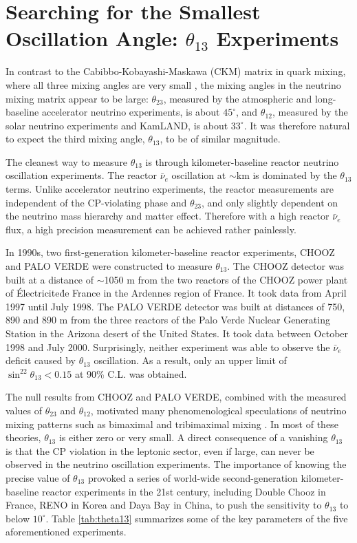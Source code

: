 \section{Searching for the Smallest Oscillation Angle: $\theta_{13}$ Experiments} 
\label{sec:theta13}
In contrast to the  Cabibbo-Kobayashi-Maskawa (CKM) matrix in quark mixing, where all three mixing angles are very small \cite{PDG14}, the mixing angles in the neutrino mixing matrix appear to be large: $\theta_{23}$, measured by the atmospheric \cite{Kajita} and long-baseline accelerator \cite{Feldman} neutrino experiments, is about $45^\circ$, and $\theta_{12}$, measured by the solar neutrino experiments and KamLAND, is about $33^\circ$. It was therefore natural to expect the third mixing angle, $\theta_{13}$, to be of similar magnitude.

The cleanest way to measure $\theta_{13}$ is through kilometer-baseline reactor neutrino oscillation experiments. The reactor $\bar\nu_e$ oscillation at $\sim$km is dominated by the $\theta_{13}$ terms. Unlike accelerator neutrino experiments, the reactor measurements are independent of the CP-violating phase and $\theta_{23}$, and only slightly dependent on the neutrino mass hierarchy and matter effect. Therefore with a high reactor $\bar\nu_e$ flux, a high precision measurement can be achieved rather painlessly. 

In 1990s, two first-generation kilometer-baseline reactor experiments, CHOOZ \cite{Chooz} and PALO VERDE \cite{Paloverde} were constructed to measure $\theta_{13}$. 
The CHOOZ detector was built at a distance of $\sim$1050 m from the two reactors of the CHOOZ power plant of \'{E}lectricite\'{d}e France in the Ardennes region of France. It took data from April 1997 until July 1998. 
The PALO VERDE detector was built at distances of 750, 890 and 890 m from the three reactors of the Palo Verde Nuclear Generating Station in the Arizona desert of the United States. It took data between October 1998 and July 2000. 
Surprisingly, neither experiment was able to observe the $\bar\nu_e$ deficit caused by $\theta_{13}$ oscillation. 
As a result, only an upper limit of $\sin^22\theta_{13} < 0.15$ at 90\% C.L. was obtained.

The null results from CHOOZ and PALO VERDE, combined with the measured values of $\theta_{23}$ and $\theta_{12}$, motivated many phenomenological speculations of neutrino mixing patterns such as bimaximal and tribimaximal mixing \cite{Harrison,Altarelli}. 
In most of these theories, $\theta_{13}$ is either zero or very small. 
A direct consequence of a vanishing $\theta_{13}$ is that the CP violation in the leptonic sector, even if large, can never be observed in the neutrino oscillation experiments. 
The importance of knowing the precise value of $\theta_{13}$ provoked a series of world-wide second-generation kilometer-baseline reactor experiments in the 21st century, including Double Chooz \cite{DChooz} in France, RENO \cite{Reno} in Korea and Daya Bay \cite{Dayabay} in China, to push the sensitivity to $\theta_{13}$ to below $10^\circ$. 
Table \ref{tab:theta13} summarizes some of the key parameters of the five aforementioned experiments.


